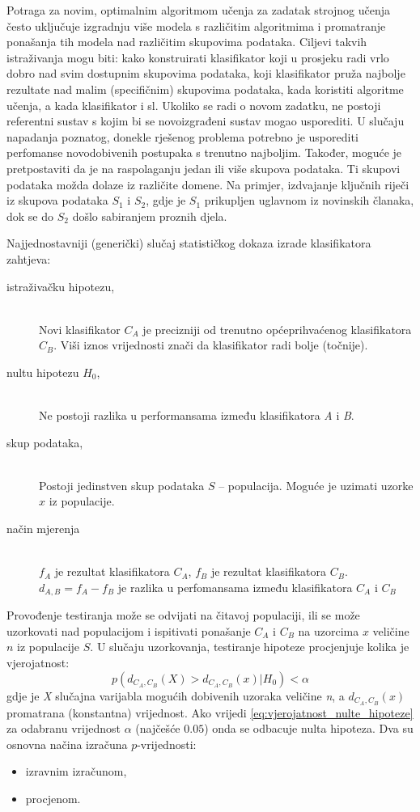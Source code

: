 Potraga za novim, optimalnim algoritmom učenja za zadatak strojnog učenja često uključuje izgradnju više modela s različitim algoritmima i promatranje ponašanja tih modela nad različitim skupovima podataka. Ciljevi takvih istraživanja mogu biti: kako konstruirati klasifikator koji u prosjeku radi vrlo dobro nad svim dostupnim skupovima podataka, koji klasifikator pruža najbolje rezultate nad malim (specifičnim) skupovima podataka, kada koristiti algoritme učenja, a kada klasifikator i sl. Ukoliko se radi o novom zadatku, ne postoji referentni sustav s kojim bi se novoizgrađeni sustav mogao usporediti. U slučaju napadanja poznatog, donekle rješenog problema potrebno je usporediti perfomanse novodobivenih postupaka s trenutno najboljim. Također, moguće je pretpostaviti da je na raspolaganju jedan ili više skupova podataka. Ti skupovi podataka možda dolaze iz različite domene. Na primjer, izdvajanje ključnih riječi iz skupova podataka $S_1$ i $S_2$, gdje je $S_1$ prikupljen uglavnom iz novinskih članaka, dok se do $S_2$ došlo sabiranjem proznih djela. 

Najjednostavniji (generički) slučaj statističkog dokaza izrade klasifikatora zahtjeva: 
\begin{description}
  \item[istraživačku hipotezu,] \hfill \\
  Novi klasifikator $C_A$ je precizniji od trenutno općeprihvaćenog klasifikatora $C_B$. Viši iznos vrijednosti znači da klasifikator radi bolje (točnije).
  \item[nultu hipotezu $H_0$,] \hfill \\
  Ne postoji razlika u performansama između klasifikatora \textit{A} i \textit{B}.
  \item[skup podataka,] \hfill \\
  Postoji jedinstven skup podataka $S$  -- populacija. Moguće je uzimati uzorke $x$ iz populacije.
  \item[način mjerenja] \hfill \\  
  $f_A$ je rezultat klasifikatora $C_A$, $f_B$ je rezultat klasifikatora $C_B$. $d_{A,B}=f_A-f_B$ je razlika u perfomansama između klasifikatora $C_A$ i $C_B$
\end{description}
Provođenje testiranja može se odvijati na čitavoj populaciji, ili se može uzorkovati nad populacijom i ispitivati ponašanje $C_A$ i $C_B$ na uzorcima $x$ veličine $n$ iz populacije $S$. U slučaju uzorkovanja, testiranje hipoteze procjenjuje kolika je vjerojatnost:
\begin{equation}
\label{eq:vjerojatnost_nulte_hipoteze}
p(d_{C_A,C_B}(X) > d_{C_A,C_B}(x) | H_{0}) < \alpha
\end{equation}
gdje je \textit{X} slučajna varijabla mogućih dobivenih uzoraka veličine \textit{n}, a $d_{C_A,C_B}(x)$ promatrana (konstantna) vrijednost. Ako vrijedi \ref{eq:vjerojatnost_nulte_hipoteze} za odabranu vrijednost $\alpha$ (najčešće $0.05$) onda se odbacuje nulta hipoteza. Dva su osnovna načina izračuna $p$-vrijednosti:
\begin{itemize}
\item izravnim izračunom,
\item procjenom.
\end{itemize}

